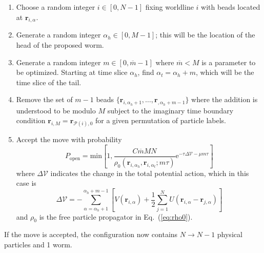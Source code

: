 \documentclass[prb,aps,amssym,nofootinbib,floatfix,notitlepage]{revtex4-1}
\renewcommand{\vec}[1]{\boldsymbol{#1}}
\newcommand{\e}[1]{\mathrm{e}^{#1}}
\renewcommand{\eqref}[1]{Eq.~(\ref{#1})}
\begin{document}
\begin{enumerate}
    \item Choose a random integer $i \in [0,N-1]$ fixing worldline $i$ with beads located
        at $\vec{r}_{i,\alpha}$.
    \item Generate a random integer $\alpha_h \in [0,M-1]$; this
        will be the location of the head of the proposed worm.
    \item Generate a random integer $m \in [0,\overline{m}-1]$ where $\overline{m} <
        M$ is a parameter to be optimized. Starting at time slice $\alpha_h$,
        find $\alpha_t = \alpha_h + m$, which will be the time slice of the tail.
    \item Remove the set of $m-1$ beads
        $\{\vec{r}_{i,\alpha_h+1},\ldots,
    \vec{r}_{,\alpha_h+m-1}\}$ where the addition is
    understood to be modulo $M$ subject to the imaginary time boundary
    condition $\vec{r}_{i,M} = \vec{r}_{\mathcal{P}(i),0}$ for a given
    permutation of particle labels.
\item Accept the move with probability
\begin{equation}
P_{\text{open}} = \mathrm{min}\left[1, 
    \frac{C \overline{m} M N}{\rho_0(\vec{r}_{i,\alpha_h},\vec{r}_{i,\alpha_t};m\tau)}
\e{-\tau \Delta \mathcal{V} - \mu m \tau} \right]
\end{equation}
%
where $\Delta \mathcal{V}$ indicates the change in the total potential action,
which in this case is
%
\begin{equation}
    \Delta\mathcal{V} = -\sum_{\alpha=\alpha_h+1}^{\alpha_h+m-1} \left[ 
        V(\vec{r}_{i,\alpha}) + \frac{1}{2}\sum_{j=1}^N
        U(\vec{r}_{i,\alpha}-\vec{r}_{j,\alpha}) \right]
\end{equation}
%
and $\rho_0$ is the free particle propagator in \eqref{eq:rho0}.
\end{enumerate}
If the move is accepted, the configuration now contains $N \to N-1$ physical
particles and 1 worm.\\[2ex]
%
\end{document}
